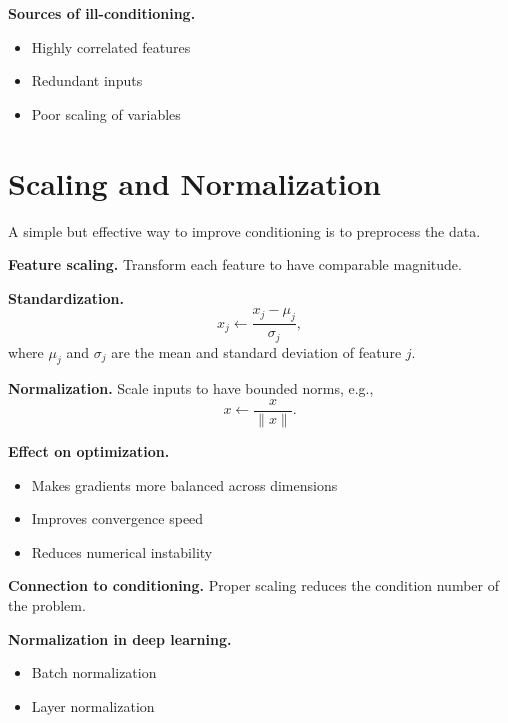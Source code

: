 \medskip

\noindent
\textbf{Sources of ill-conditioning.}
\begin{itemize}
    \item Highly correlated features
    \item Redundant inputs
    \item Poor scaling of variables
\end{itemize}

\section{Scaling and Normalization}

A simple but effective way to improve conditioning is to preprocess the data.

\medskip

\noindent
\textbf{Feature scaling.}  
Transform each feature to have comparable magnitude.

\medskip

\noindent
\textbf{Standardization.}
\[
x_j \leftarrow \frac{x_j - \mu_j}{\sigma_j},
\]
where $\mu_j$ and $\sigma_j$ are the mean and standard deviation of feature $j$.

\medskip

\noindent
\textbf{Normalization.}  
Scale inputs to have bounded norms, e.g.,
\[
x \leftarrow \frac{x}{\|x\|}.
\]

\medskip

\noindent
\textbf{Effect on optimization.}
\begin{itemize}
    \item Makes gradients more balanced across dimensions
    \item Improves convergence speed
    \item Reduces numerical instability
\end{itemize}

\medskip

\noindent
\textbf{Connection to conditioning.}  
Proper scaling reduces the condition number of the problem.

\medskip

\noindent
\textbf{Normalization in deep learning.}
\begin{itemize}
    \item Batch normalization
    \item Layer normalization
\end{itemize}

\medskip

